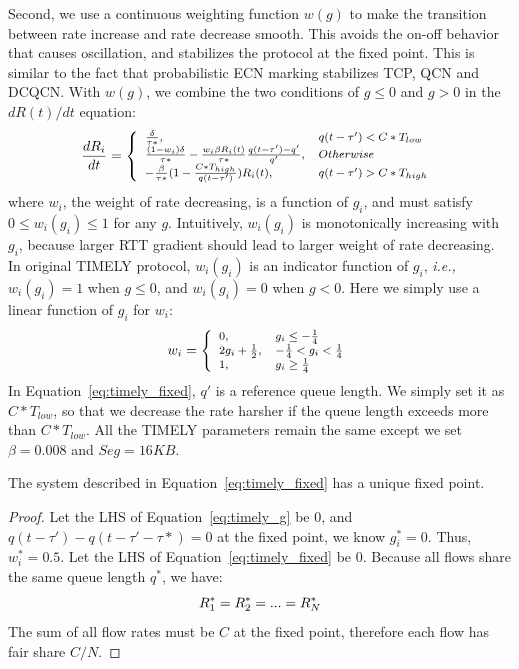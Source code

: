Second, we use a continuous weighting function $w(g)$ to make the transition between rate increase and rate decrease
smooth. This avoids the on-off behavior that causes oscillation, and stabilizes the protocol at the fixed point. 
This is similar to the fact that probabilistic ECN marking stabilizes TCP, QCN and DCQCN. With $w(g)$, we combine 
the two conditions of $g \le 0$ and $g>0$ in the $dR(t)/dt$ equation:
\begin{equation}
\small
\frac{{dR_i}}{{dt}} = \left\{ \begin{array}{ll}
\frac{\delta }{{\tau *}}, & q(t - \tau ') < C*{T_{low}}\\
\frac{{(1 - {w_i})\delta }}{{\tau *}} - \frac{{{w_i}\beta {R_i}(t)}}{{\tau *}}\frac{{q(t - \tau ') - q'}}{{q'}}, & Otherwise\\
 - \frac{\beta }{{\tau *}}(1 - \frac{{C*{T_{high}}}}{{q(t - \tau ')}})R_i(t), & q(t - \tau ') > C*{T_{high}}
\end{array} \right.\\
\label{eq:timely_fixed}
\end{equation}
where $w_i$, the weight of rate decreasing, is a function of $g_i$, and must satisfy $0 \le w_i(g_i) \le 1$ for any $g$. 
Intuitively, $w_i(g_i)$ is monotonically increasing with $g_i$, because larger RTT gradient should lead to larger 
weight of rate decreasing. In original TIMELY protocol, $w_i(g_i)$ is an indicator function of $g_i$, {\em i.e.,} 
$w_i(g_i)=1$ when $g \le 0$, and $w_i(g_i)=0$ when $g<0$. Here we simply use a linear function of $g_i$ for $w_i$:
\begin{equation}
\small
{w_i} = \left\{ \begin{array}{ll}
0, & {g_i \le  - \frac{1}{4}} \\
2{g_i} + \frac{1}{2}, & { - \frac{1}{4} < g_i < \frac{1}{4}} \\
1, & {g_i \ge \frac{1}{4}}
\end{array} \right.
\end{equation}
In Equation~\ref{eq:timely_fixed}, $q'$ is a reference queue length. We simply set it as $C*T_{low}$, 
so that we decrease the rate harsher if the queue length exceeds more than $C*T_{low}$. All the TIMELY
parameters remain the same except we set $\beta=0.008$ and $Seg=16KB$. 
\begin{thm}
The system described in Equation~\ref{eq:timely_fixed} has a unique fixed point.
\end{thm}
\begin{proof}
Let the LHS of Equation~\ref{eq:timely_g} be 0, and $q(t - \tau ') - q(t - \tau ' - \tau *) = 0$ at the fixed 
point, we know $g_i^*=0$. Thus, $w_i^*=0.5$. Let the LHS of Equation~\ref{eq:timely_fixed} be 0. Because
all flows share the same queue length $q^*$, we have:
\begin{equation}
\small
R_1^* = R_2^* = ... = R_N^*
\end{equation}
The sum of all flow rates must be $C$ at the fixed point, therefore each flow has fair share $C/N$. 
\end{proof}
